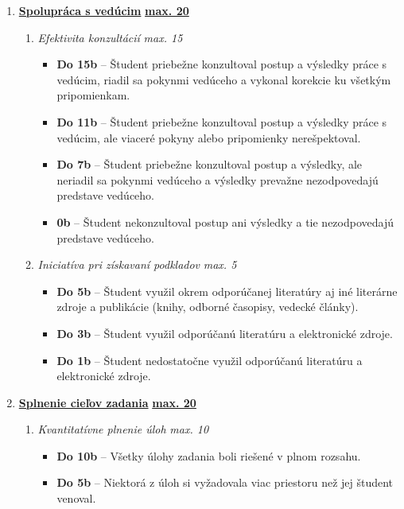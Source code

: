 \begin{enumerate}[label=\textbf{\arabic*.}]

    \item \underline{\textbf{Spolupráca s vedúcim}} \hfill \underline{\textbf{max. 20}}
    
    \begin{enumerate}
        \item \textit{Efektivita konzultácií} \hfill \textit{max. 15}
        \begin{itemize}
            \item \textbf{Do 15b} – Študent priebežne konzultoval postup a výsledky práce s vedúcim, riadil sa pokynmi vedúceho a vykonal korekcie ku všetkým pripomienkam.
            \item \textbf{Do 11b} – Študent priebežne konzultoval postup a výsledky práce s vedúcim, ale viaceré pokyny alebo pripomienky nerešpektoval.
            \item \textbf{Do 7b} – Študent priebežne konzultoval postup a výsledky, ale neriadil sa pokynmi vedúceho a výsledky prevažne nezodpovedajú predstave vedúceho.
            \item \textbf{0b} – Študent nekonzultoval postup ani výsledky a tie nezodpovedajú predstave vedúceho.
        \end{itemize}

        \item \textit{Iniciatíva pri získavaní podkladov} \hfill \textit{max. 5}
        \begin{itemize}
            \item \textbf{Do 5b} – Študent využil okrem odporúčanej literatúry aj iné literárne zdroje a publikácie (knihy, odborné časopisy, vedecké články).
            \item \textbf{Do 3b} – Študent využil odporúčanú literatúru a elektronické zdroje.
            \item \textbf{Do 1b} – Študent nedostatočne využil odporúčanú literatúru a elektronické zdroje.
        \end{itemize}
    \end{enumerate}

    \item \underline{\textbf{Splnenie cieľov zadania}} \hfill \underline{\textbf{max. 20}}
    
    \begin{enumerate}
        \item \textit{Kvantitatívne plnenie úloh} \hfill \textit{max. 10}
        \begin{itemize}
            \item \textbf{Do 10b} – Všetky úlohy zadania boli riešené v plnom rozsahu.
            \item \textbf{Do 5b} – Niektorá z úloh si vyžadovala viac priestoru než jej študent venoval.
        \end{itemize}


\end{enumerate}
\end{enumerate}
